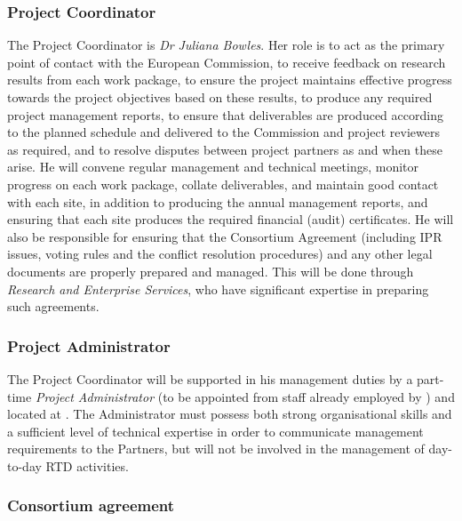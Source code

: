\documentclass[a4paper,11pt]{article}
\begin{document}
\vspace{12pt}
\subsubsection*{Project Coordinator}
\vspace{-6pt}

The Project Coordinator is \emph{Dr Juliana Bowles}.  Her role
is to act as the primary point of contact with the European
Commission, to receive feedback on research results from each
work package, to ensure the project maintains effective
progress towards the project objectives based on these results,
to produce any required  project management reports, to ensure
that deliverables are produced according to the planned
schedule and delivered to the Commission and project reviewers
as required, and to resolve disputes between project partners
as and when these arise.  He will convene regular management
and technical meetings, monitor progress on each work package,
collate deliverables, and maintain good contact with each site,
in addition to producing the annual management reports, and
ensuring that each site produces the required financial (audit)
certificates.  He will also be responsible for ensuring that
the Consortium Agreement (including IPR issues, voting rules and the conflict resolution procedures)
and any other legal documents are properly prepared and managed. This will be
done through \SAshort{} \emph{Research and Enterprise
Services}, who have significant expertise in preparing such
agreements.

\vspace{12pt}
\subsubsection*{Project Administrator}
\vspace{-6pt}

The Project Coordinator will be supported in his management
duties by a part-time \emph{Project Administrator} (to be appointed
from staff already employed by \SA{}) and located at \SA{}.  The Administrator
must possess both strong organisational skills and a
sufficient level of technical expertise in order to communicate
management requirements to the Partners, but will not be
involved in the management of day-to-day RTD activities.

\vspace{12pt}
\subsubsection*{Consortium agreement}
\vspace{-6pt}
\end{document}
